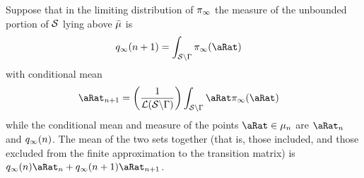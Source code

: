 \documentclass[\econtexRoot/BufferStockTheory.tex]{subfiles}
\begin{document}
\begin{comment}
  Since in practice we will only ever be simulating the model over a finite time horizon (call it $\tMax$, one option would be to select multiple of $\tMax$.  But as we are likely to be simulating thousands of periods, this would generate an analytical expression with thousands of terms which would likely be costly to evaluate.

  If we are simulating the population in addition to constructing a discrete Markov chain, a natural choice is to choose the number of terms $\tAbs$ in such a way that the population mass corresponding to the truncated portion of the series is ``small'' relative to the number of persons.


  However, the procedure for constructing an infinite horizon version of that approximation requires a slight modification of the method described above, which applies for any finite time interval.  The modification is that the probability mass associated with the unbounded portion of $\SetFullCnts$ needs to be redistributed to the bounded interval, while preserving the mean.


  The most natural choice is to redistribute the portion of the distribution that lives above $\Top{\SetPartCnts}_{\NumAprxStes}$ into $\SetPartCnts_{\NumAprxStes}$ and the portion that lives below $\Bot{\SetPartCnts}_{1}$ into $\SetPartCnts_{1}$.
\end{comment}

Suppose that in the limiting distribution of $\pi_{\infty}$ the measure of the unbounded portion of $\mathcal{S}$ lying above $\bar{\mu}$ is
\begin{equation}\begin{gathered}\begin{aligned}
  \pmfBinNow_{\infty}({\NumAprxStes+1}) & =\int_{\SetFullCnts \backslash \KrnPntNxtFmPntNowSetSprtTrnc}\DnsPnt_{\infty}(\pnt)  
\end{aligned}\end{gathered}\end{equation}
with conditional mean
\begin{equation}\begin{gathered}\begin{aligned}
  \pnterp_{\NumAprxStes+1} & = \left(\frac{1}{\Lebes(\SetFullCnts \backslash \KrnPntNxtFmPntNowSetSprtTrnc)}\right)\int_{\SetFullCnts \backslash \KrnPntNxtFmPntNowSetSprtTrnc}\pnt \DnsPnt_{\infty}(\pnt)  
\end{aligned}\end{gathered}\end{equation}
while the conditional mean and measure of the points $\pnt \in \SetPartCnts_{\NumAprxStes}$ are $\pnterp_{\NumAprxStes}$ and $q_{\infty}(n)$.  The mean of the two sets together (that is, those included, and those excluded from the finite approximation to the transition matrix) is $\pmfBinNow_{\infty}(\NumAprxStes)\pnterp_{\NumAprxStes}+\pmfBinNow_{\infty}(\NumAprxStes+1)\pnterp_{\NumAprxStes+1}$.
\end{document}
